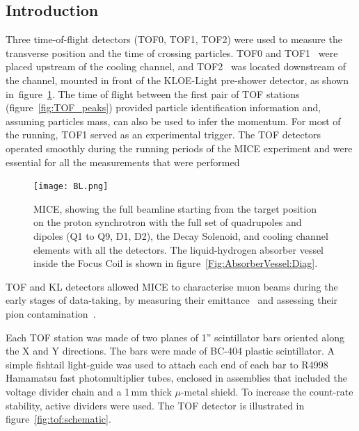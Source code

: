 \subsection{Introduction}
\label{SubSect:TOF_Intro}

Three time-of-flight detectors (TOF0, TOF1, TOF2) were used to measure the transverse position and the time
of crossing particles. TOF0 and TOF1~\cite{NOTE145}\cite{NOTE241}\cite{2010NIMPA.615...14B} were
placed upstream of the cooling channel, and TOF2~\cite{NOTE286} was
located downstream of the channel, mounted in front of the KLOE-Light pre-shower detector, as shown
in~figure~\ref{fig:BL}.
The time of flight between the first pair of TOF stations (figure~\ref{fig:TOF_peaks})
provided particle identification information and, assuming particles mass, can also be used to infer the momentum.
For most of the running, TOF1 served as an experimental trigger.
The TOF detectors operated smoothly during the running periods of the MICE experiment and were essential for all the measurements that were performed~\cite{Rajaram:2015bra}\cite{2015ehep.confE.521B}


\begin{figure}[!htb]
  \begin{center}
    \texttt{[image: BL.png]}
    \caption{MICE, showing the full beamline starting from the target position on the proton synchrotron with the full set of quadrupoles and dipoles (Q1 to Q9, D1, D2), the Decay Solenoid, and cooling channel elements with all the detectors. The liquid-hydrogen absorber vessel inside the Focus Coil is shown in figure~\ref{Fig:AbsorberVessel:Diag}.}
    \label{fig:BL}
  \end{center}
\end{figure}

TOF and KL detectors allowed MICE to characterise muon beams during the early stages of data-taking, by measuring their emittance~\cite{2013arXiv1306.1509T} and assessing their pion contamination~\cite{2016JInst..11P3001A}.

Each TOF station was made of two planes of 1'' scintillator bars oriented along the X and Y directions.
The bars were made of BC-404 plastic scintillator. A simple fishtail light-guide was used to attach each end of each bar to R4998 Hamamatsu fast photomultiplier tubes,
enclosed in assemblies that included the voltage divider chain and a 1\,mm thick $\mu$-metal shield. To increase the count-rate stability, active
dividers were used. The TOF detector is illustrated in figure~\ref{fig:tof:schematic}.

